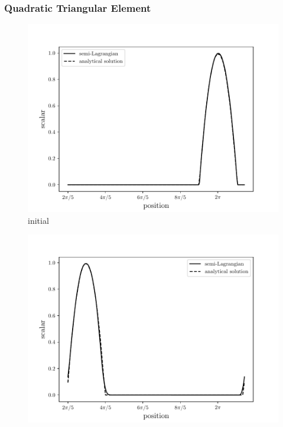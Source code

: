




\begin{frame} 
 \frametitle{\normalsize Quadratic Triangular Element}
\vspace{-1.0cm}
\begin{center}
\begin{figure}[H]
     \centering
     \begin{minipage}{.5\linewidth}
      \centering
      \includegraphics[scale=0.33]{./images/SLquad0.pdf}\\
      \tiny initial 
     \end{minipage}%
     \begin{minipage}{.5\linewidth}
      \centering
      \includegraphics[scale=0.33]{./images/SLquad1.pdf}\\

\end{minipage}
\end{figure}
\end{center}
\end{frame}
